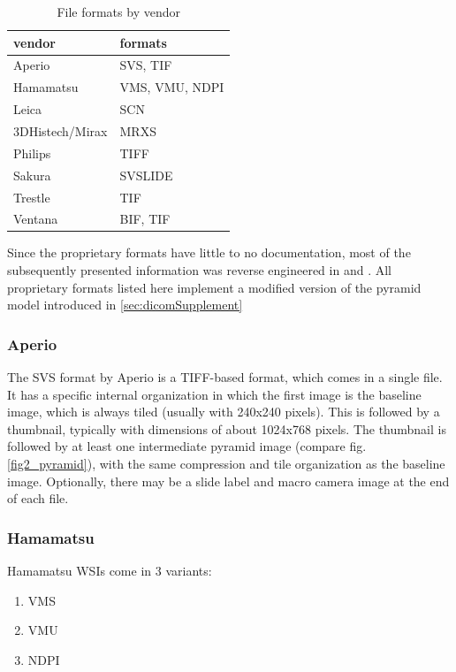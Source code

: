 \begin{table}[!h]
	\begin{center}
		\begin{tabular}{| l | l |}
			\hline
			\textbf{vendor} & \textbf{formats}\\ \hline
			Aperio & SVS, TIF\\ \hline
			Hamamatsu & VMS, VMU, NDPI\\ \hline
			Leica & SCN\\ \hline
			3DHistech/Mirax & MRXS\\ \hline
			Philips & TIFF\\ \hline
			Sakura & SVSLIDE\\ \hline
			Trestle & TIF\\ \hline
			Ventana & BIF, TIF\\ \hline
		\end{tabular}
		\caption{File formats by vendor}
		\label{tab2_formatsByVendor}
	\end{center}
\end{table}

Since the proprietary formats have little to no documentation, most of the subsequently presented information was reverse engineered in \cite{Goode13} and \cite{web:openslide}. All proprietary formats listed here implement a modified version of the pyramid model introduced in \ref{sec:dicomSupplement}


\subsubsection{Aperio}
The SVS format by Aperio is a TIFF-based format, which comes in a single file\cite{Goode13}. It has a specific internal organization in which the first image is the baseline image, which is always tiled (usually with 240x240 pixels). This is followed by a thumbnail, typically with dimensions of about 1024x768 pixels. The thumbnail is followed by at least one intermediate pyramid image (compare fig. \ref{fig2_pyramid}), with the same compression and tile organization as the baseline image\cite{web:openslide}. Optionally, there may be a slide label and macro camera image at the end of each file\cite{web:openslide}.


\subsubsection{Hamamatsu}
Hamamatsu WSIs come in 3 variants:
\begin{enumerate}[(1)]
	\item VMS
	\item VMU
	\item NDPI
\end{enumerate}

